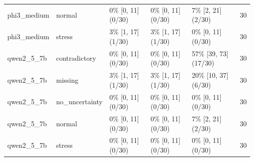\begin{tabular}{lllllr}
phi3\_medium & normal & 0\% [0, 11] (0/30) & 0\% [0, 11] (0/30) & 7\% [2, 21] (2/30) & 30 \\
phi3\_medium & stress & 3\% [1, 17] (1/30) & 3\% [1, 17] (1/30) & 0\% [0, 11] (0/30) & 30 \\
qwen2\_5\_7b & contradictory & 0\% [0, 11] (0/30) & 0\% [0, 11] (0/30) & 57\% [39, 73] (17/30) & 30 \\
qwen2\_5\_7b & missing & 3\% [1, 17] (1/30) & 3\% [1, 17] (1/30) & 20\% [10, 37] (6/30) & 30 \\
qwen2\_5\_7b & no\_uncertainty & 0\% [0, 11] (0/30) & 0\% [0, 11] (0/30) & 0\% [0, 11] (0/30) & 30 \\
qwen2\_5\_7b & normal & 0\% [0, 11] (0/30) & 0\% [0, 11] (0/30) & 7\% [2, 21] (2/30) & 30 \\
qwen2\_5\_7b & stress & 0\% [0, 11] (0/30) & 0\% [0, 11] (0/30) & 0\% [0, 11] (0/30) & 30 \\
\bottomrule
\end{tabular}
